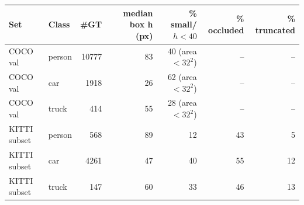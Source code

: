 \begin{tabular}{llrrrrr}
\toprule
Set & Class & \#GT & median box h (px) & \% small/$h{<}40$ & \% occluded & \% truncated \\
\midrule
COCO val & person & 10777 & 83 & 40 (area$<32^2$) & -- & -- \\
COCO val & car & 1918 & 26 & 62 (area$<32^2$) & -- & -- \\
COCO val & truck & 414 & 55 & 28 (area$<32^2$) & -- & -- \\
\midrule
KITTI subset & person & 568 & 89 & 12 & 43 & 5 \\
KITTI subset & car & 4261 & 47 & 40 & 55 & 12 \\
KITTI subset & truck & 147 & 60 & 33 & 46 & 13 \\
\bottomrule
\end{tabular}
